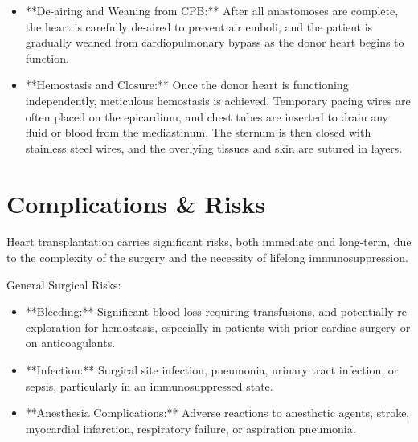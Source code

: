 \begin{itemize}
    \begin{enumerate}
      \item **Left Atrial Anastomosis:** The donor's left atrium is connected to the recipient's left atrial cuff, ensuring proper alignment of the pulmonary veins.
      \item **Right Atrial Anastomosis (Standard Biatrial):** The donor's right atrium is connected to the recipient's right atrial cuff, incorporating the superior and inferior venae cavae.
      \item **Bicaval Anastomosis (Alternative):** In the bicaval technique, the donor's superior vena cava is directly anastomosed to the recipient's SVC, and the donor's inferior vena cava to the recipient's IVC, creating a more anatomically correct right atrium.
      \item **Pulmonary Artery Anastomosis:** The donor pulmonary artery is connected to the recipient's pulmonary artery.
      \item **Aortic Anastomosis:** The donor aorta is connected to the recipient's aorta.
    \end{enumerate}
  
  \item **De-airing and Weaning from CPB:** After all anastomoses are complete, the heart is carefully de-aired to prevent air emboli, and the patient is gradually weaned from cardiopulmonary bypass as the donor heart begins to function.
  
  \item **Hemostasis and Closure:** Once the donor heart is functioning independently, meticulous hemostasis is achieved. Temporary pacing wires are often placed on the epicardium, and chest tubes are inserted to drain any fluid or blood from the mediastinum. The sternum is then closed with stainless steel wires, and the overlying tissues and skin are sutured in layers.
\end{itemize}

\section*{Complications \& Risks}
Heart transplantation carries significant risks, both immediate and long-term, due to the complexity of the surgery and the necessity of lifelong immunosuppression.

General Surgical Risks:

\begin{itemize}
  \item **Bleeding:** Significant blood loss requiring transfusions, and potentially re-exploration for hemostasis, especially in patients with prior cardiac surgery or on anticoagulants.
  \item **Infection:** Surgical site infection, pneumonia, urinary tract infection, or sepsis, particularly in an immunosuppressed state.
  \item **Anesthesia Complications:** Adverse reactions to anesthetic agents, stroke, myocardial infarction, respiratory failure, or aspiration pneumonia.
\end{itemize}


